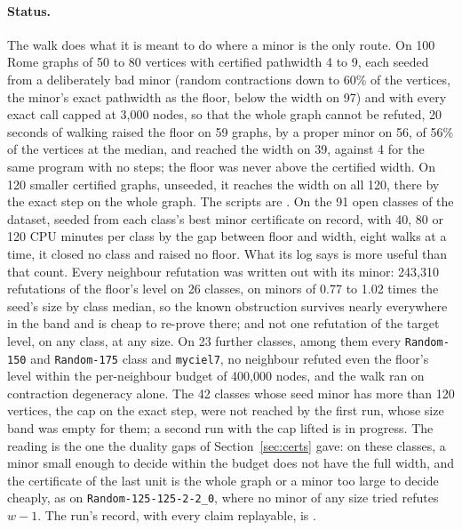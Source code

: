 \paragraph{Status.} The walk does what it is meant to do where a minor is
the only route. On 100 Rome graphs of 50 to 80 vertices with certified
pathwidth 4 to 9, each seeded from a deliberately bad minor (random
contractions down to 60\% of the vertices, the minor's exact pathwidth as the
floor, below the width on 97) and with every exact call capped at 3,000
nodes, so that the whole graph cannot be refuted, 20 seconds of walking
raised the floor on 59 graphs, by a proper minor on 56, of 56\% of the
vertices at the median, and reached the width on 39, against 4 for the same
program with no steps; the floor was never above the certified width. On 120
smaller certified graphs, unseeded, it reaches the width on all 120, there by
the exact step on the whole graph. The scripts are
. On the 91 open classes of the dataset, seeded from each
class's best minor certificate on record, with 40, 80 or 120 CPU minutes per
class by the gap between floor and width, eight walks at a time, it closed no
class and raised no floor. What its log says is more useful than that count.
Every neighbour refutation was written out with its minor: 243,310
refutations of the floor's level on 26 classes, on minors of 0.77 to 1.02
times the seed's size by class median, so the known obstruction survives
nearly everywhere in the band and is cheap to re-prove there; and not one
refutation of the target level, on any class, at any size. On 23 further
classes, among them every \texttt{Random-150} and \texttt{Random-175} class
and \texttt{myciel7}, no neighbour refuted even the floor's level within the
per-neighbour budget of 400,000 nodes, and the walk ran on contraction
degeneracy alone. The 42 classes whose seed minor has more than 120 vertices,
the cap on the exact step, were not reached by the first run, whose size band
was empty for them; a second run with the cap lifted is in progress. The
reading is the one the duality gaps of Section~\ref{sec:certs} gave: on these
classes, a minor small enough to decide within the budget does not have the
full width, and the certificate of the last unit is the whole graph or a minor
too large to decide cheaply, as on \texttt{Random-125-125-2-2\_0}, where no
minor of any size tried refutes $w-1$. The run's record, with every claim
replayable, is .
